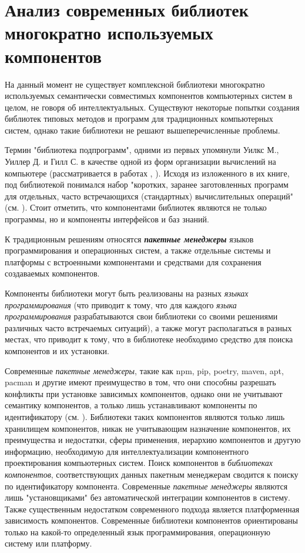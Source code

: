 \section{Анализ современных библиотек многократно используемых компонентов}
\label{ostis_library_analysis}

На данный момент не существует комплексной библиотеки многократно используемых семантически совместимых компонентов компьютерных систем в целом, не говоря об интеллектуальных. Существуют некоторые попытки создания библиотек типовых методов и программ для традиционных компьютерных систем, однако такие библиотеки не решают вышеперечисленные проблемы.

Термин "библиотека подпрограмм"{}, одними из первых упомянули Уилкс М., Уиллер Д. и Гилл С. в качестве одной из форм организации вычислений на компьютере (рассматривается в работах , ). Исходя из изложенного в их книге, под библиотекой понимался набор "коротких, заранее заготовленных программ для отдельных, часто встречающихся (стандартных) вычислительных операций"{} (см. ). Стоит отметить, что компонентами библиотек являются не только программы, но и компоненты интерфейсов и баз знаний.

К традиционным решениям относятся \textbf{\textit{пакетные менеджеры}} языков программирования и операционных систем, а также отдельные системы и платформы с встроенными компонентами и средствами для сохранения создаваемых компонентов.

Компоненты библиотеки могут быть реализованы на разных \textit{языках программирования} (что приводит к тому, что для каждого \textit{языка программирования} разрабатываются свои библиотеки со своими решениями различных часто встречаемых ситуаций), а также могут располагаться в разных местах, что приводит к тому, что в библиотеке необходимо средство для поиска компонентов и их установки.

Современные \textit{пакетные менеджеры}, такие как npm, pip, poetry, maven, apt, pacman и другие имеют преимущество в том, что они способны разрешать конфликты при установке зависимых компонентов, однако они не учитывают семантику компонентов, а только лишь устанавливают компоненты по идентификатору (см. ). Библиотеки таких компонентов являются только лишь хранилищем компонентов, никак не учитывающим назначение компонентов, их преимущества и недостатки, сферы применения, иерархию компонентов и другую информацию, необходимую для интеллектуализации компонентного проектирования компьютерных систем. Поиск компонентов в \textit{библиотеках компонентов}, соответствующих данных пакетным менеджерам сводится к поиску по идентификатору компонента. Современные \textit{пакетные менеджеры} являются лишь "установщиками"{} без автоматической интеграции компонентов в систему. Также существенным недостатком современного подхода является платформенная зависимость компонентов. Современные библиотеки компонентов ориентированы только на какой-то определенный язык программирования, операционную систему или платформу.

